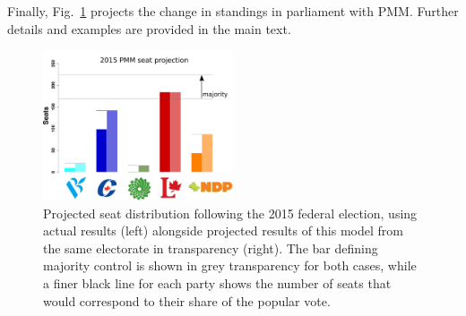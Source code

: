 Finally, Fig.~\ref{fig:hypo_2015_sum} projects the change in standings in parliament with PMM. Further details and examples are provided in the main text.

\begin{figure}[h!]
  \includegraphics[width=0.50\textwidth,clip]{Figs/2015_seat_projection}
  \caption{Projected seat distribution following the 2015 federal election, using actual results (left) alongside projected results of this model from the same electorate in transparency (right). The bar defining majority control is shown in grey transparency for both cases, while a finer black line for each party shows the number of seats that would correspond to their share of the popular vote.}
\label{fig:hypo_2015_sum}
\end{figure}
